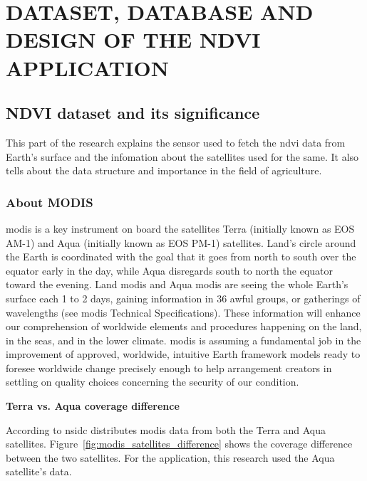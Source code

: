 \chapter{DATASET, DATABASE AND DESIGN OF THE NDVI APPLICATION}
\label{chap:dataset & database}

\section{NDVI dataset and its significance}

This part of the research explains the sensor used to fetch the \gls{ndvi} data from Earth's surface and the infomation about the satellites used for the same. It also tells about the data structure and importance in the field of agriculture.

\subsection{About MODIS}

\newcommand{\MYhref}[3][blue]{\href{#2}{\color{#1}{#3}}}%

\gls{modis} is a key instrument on board the satellites Terra (initially known as EOS AM-1) and Aqua (initially known as EOS PM-1) satellites. Land's circle around the Earth is coordinated with the goal that it goes from north to south over the equator early in the day, while Aqua disregards south to north the equator toward the evening. Land \gls{modis} and Aqua \gls{modis} are seeing the whole Earth's surface each 1 to 2 days, gaining information in 36 awful groups, or gatherings of wavelengths (see \gls{modis} Technical Specifications). These information will enhance our comprehension of worldwide elements and procedures happening on the land, in the seas, and in the lower climate. \gls{modis} is assuming a fundamental job in the improvement of approved, worldwide, intuitive Earth framework models ready to foresee worldwide change precisely enough to help arrangement creators in settling on quality choices concerning the security of our condition. \cite{MODIS} \\
\centerline{\textbf{Terra vs. Aqua coverage difference}}
According to \gls{nsidc} distributes \gls{modis} data from both the Terra and Aqua satellites. Figure~\ref{fig:modis_satellites_difference} shows the coverage difference between the two satellites. For the application, this research used the Aqua satellite's data.

